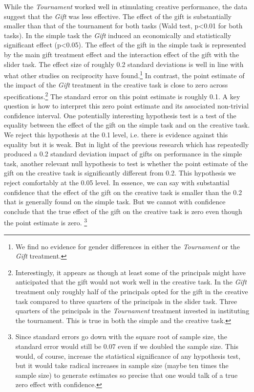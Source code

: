 While the \textit{Tournament} worked well in stimulating creative performance, the 
data suggest that the \textit{Gift} was less effective.  
The effect of the gift is substantially smaller than that of the 
tournament for both tasks (Wald test, p<0.01 for both tasks). 
In the simple task the 
\textit{Gift} induced an economically and statistically significant effect (p<0.05). The effect of the gift in the simple
task is represented by the main gift treatment effect and the interaction effect of the gift with the slider task. The 
effect size of roughly 0.2 standard deviations is well in line with what other studies on reciprocity have found.\footnote{We find 
no evidence for gender differences in either the \textit{Tournament} or the \textit{Gift} treatment.} 
In contrast, the point estimate of the impact of the \textit{Gift}  treatment 
in the creative task is close to zero across specifications.\footnote{Interestingly, it appears as though at least some 
of the principals might have anticipated that the gift would not work well in the creative task. 
In the \textit{Gift} treatment only roughly half of the principals opted for the gift in the creative task 
compared to three quarters of the principals in the slider task. 
Three quarters of the principals in the \textit{Tournament} treatment invested in instituting the tournament. This is true in both the simple and the creative task.}  The standard error on this point estimate is roughly 0.1.
A key question is how to interpret this zero point estimate and its associated non-trivial confidence interval. 
One potentially interesting hypothesis test is a test of the equality between the effect of the gift on the simple task and on the creative task.
We reject this hypothesis at the 0.1 level, i.e. there is evidence against this equality but it is weak. But in light of the previous research
which has repeatedly produced a 0.2 standard deviation impact of gifts on performance in the simple task, another relevant null hypothesis to test 
is whether the point estimate of the gift on the creative task is significantly different from 0.2. This hypothesis we reject comfortably at the 0.05 level. 
In essence, we can say with substantial confidence that the effect of the gift on the creative task is smaller than the 0.2 that is generally found on the simple task. 
But we cannot with confidence conclude that the true effect of the gift on the creative task is zero even though the point estimate is zero. 
\footnote{Since standard errors go down with the square root of sample size,  the standard error would still be 0.07 even if we doubled the sample size. This would, of course,
increase the statistical significance of any hypothesis test, but it would take radical increases in sample size (maybe ten times the sample size) to generate estimates so precise that 
one would talk of a true zero effect with confidence.} 



